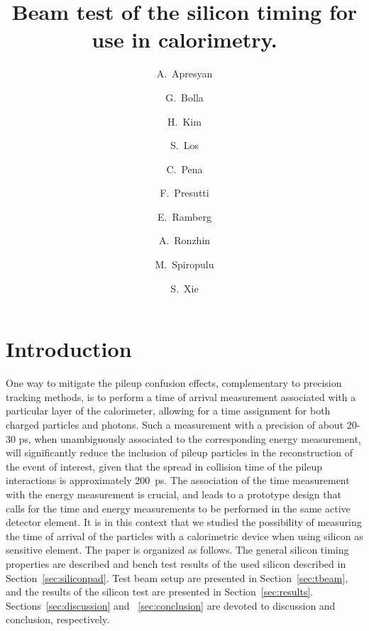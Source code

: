 \documentclass[12pt]{article}
\title{Beam test of the silicon timing for use in calorimetry.}
\author[1]{A.~Apresyan}
\author[2]{G.~Bolla}
\author[3]{H.~Kim}
\author[2]{S.~Los}
\author[1]{C.~Pena}
\author[1]{F.~Presutti}
\author[2]{E.~Ramberg}
\author[2]{A.~Ronzhin}
\author[1]{M.~Spiropulu}
\author[1]{S.~Xie}
\affil[1]{California Institute of Technology, Pasadena, CA, USA}
\affil[2]{Fermi National Accelerator Laboratory, Batavia, IL, USA}
\affil[3]{University of Chicago, Chicago, IL,  USA}
\date{}
\begin{document}
\linenumbers
\maketitle



\section{Introduction} 

One way to mitigate the pileup confusion effects, complementary to precision
tracking methods, is to perform a time of arrival measurement associated with a
particular layer of the calorimeter, allowing for a time assignment for both
charged particles and photons. Such a measurement with a precision of about
20-30 ps, when unambiguously associated to the corresponding energy measurement,
will significantly reduce the inclusion of pileup particles in the
reconstruction of the event of interest, given that the spread in collision time
of the pileup interactions is approximately 200~ps. The association of the time
measurement with the energy measurement is crucial, and leads to a prototype
design that calls for the time and energy measurements to be performed in the
same active detector element. It is in this context that we studied the
possibility of measuring the time of arrival of the particles with a
calorimetric device when using silicon as sensitive element. The paper is organized as follows. The general silicon timing properties are
described and bench test results of the used silicon described in
Section~\ref{sec:siliconpad}. Test beam setup are presented in
Section~\ref{sec:tbeam}, and the results of the silicon test are presented in
Section~\ref{sec:results}. Sections~\ref{sec:discussion} and
~\ref{sec:conclusion} are devoted to discussion and conclusion, respectively.
\end{document}
